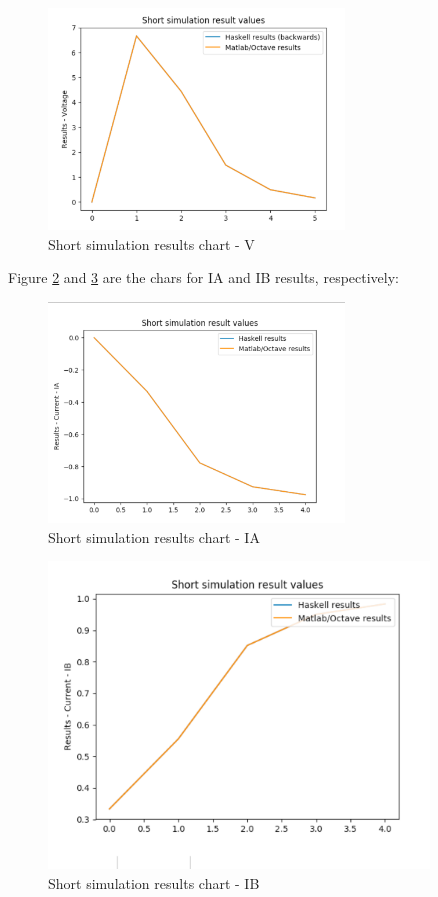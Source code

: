 \begin{figure}[H]
   \centering
   \includegraphics[width=0.7\textwidth]{img/voltageplot.png}
   \caption{Short simulation results chart - V}
   \label{reschart1}
\end{figure}

Figure \ref{iachart} and \cref{ibchart} are the chars for IA and IB results, respectively:

\begin{figure}[H]
   \centering
   \includegraphics[width=0.7\textwidth]{img/iaplot.png}
   \caption{Short simulation results chart - IA}
   \label{iachart}
\end{figure}



\begin{figure}[H]
   \centering
   \includegraphics[width=0.9\textwidth]{img/ibplot.png}
   \caption{Short simulation results chart - IB}
   \label{ibchart}
\end{figure}

